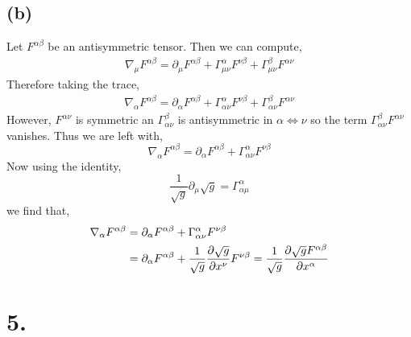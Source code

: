 \documentclass[12pt]{article}
\begin{document}
\subsection*{(b)}

Let $F^{\alpha \beta}$ be an antisymmetric tensor.  Then we can compute,
\begin{align*}
\nabla_\mu F^{\alpha \beta} = \partial_\mu F^{\alpha \beta} + \Gamma^\alpha_{\mu \nu} F^{\nu \beta} + \Gamma^\beta_{\mu \nu} F^{\alpha
 \nu} 
\end{align*}
Therefore taking the trace,
\begin{align*}
\nabla_\alpha F^{\alpha \beta} = \partial_\alpha F^{\alpha \beta} + \Gamma^\alpha_{\alpha \nu} F^{\nu \beta} + \Gamma^{\beta}_{\alpha \nu} F^{\alpha \nu}
\end{align*}
However, $F^{\alpha \nu}$ is symmetric an $\Gamma^\beta_{\alpha \nu}$ is antisymmetric in $\alpha \iff \nu$ so the term $\Gamma^{\beta}_{\alpha \nu} F^{\alpha \nu}$ vanishes. Thus we are left with,
\[ \nabla_\alpha F^{\alpha \beta} = \partial_\alpha F^{\alpha \beta} + \Gamma^\alpha_{\alpha \nu} F^{\nu \beta} \]
Now using the identity,
\[ \frac{1}{\sqrt{g}} \partial_\mu \sqrt{g} = \Gamma^\alpha_{\alpha \mu} \]
we find that,
\begin{align*}
\nabla_\alpha F^{\alpha \beta} & = \partial_\alpha F^{\alpha \beta} + \Gamma^\alpha_{\alpha \nu} F^{\nu \beta} 
\\
& = \partial_\alpha F^{\alpha \beta} + \frac{1}{\sqrt{g}} \frac{\partial{\sqrt{g}}}{\partial{x^\nu}} F^{\nu \beta} = \frac{1}{\sqrt{g}} \frac{\partial{\sqrt{g} F^{\alpha \beta}}}{\partial{x^\alpha}} 
\end{align*}

\section*{5.}
\end{document}
